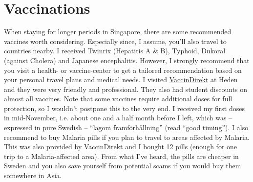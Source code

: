 \section*{Vaccinations}
\label{vacc}
When staying for longer periods in Singapore, there are some recommended vaccines worth considering. Especially since, I assume, you'll also travel to countries nearby. I received Twinrix (Hepatitis A \& B), Typhoid, Dukoral (against Cholera) and Japanese encephalitis. However, I strongly recommend that you visit a health- or vaccine-center to get a tailored recommendation based on your personal travel plans and medical needs. I visited \href{https://vaccindirekt.se/mottagningar/heden-gbg/}{VaccinDirekt} at Heden and they were very friendly and professional. They also had student discounts on almost all vaccines. Note that some vaccines require additional doses for full protection, so I wouldn't postpone this to the very end. I received my first doses in mid-November, i.e. about one and a half month before I left, which was -- expressed in pure Swedish -- ``lagom framförhållning'' (read ``good timing''). I also recommend to buy Malaria pills if you plan to travel to areas affected by Malaria. This was also provided by VaccinDirekt and I bought 12 pills (enough for one trip to a Malaria-affected area). From what I've heard, the pills are cheaper in Sweden and you also save yourself from potential scams if you would buy them somewhere in Asia.   
